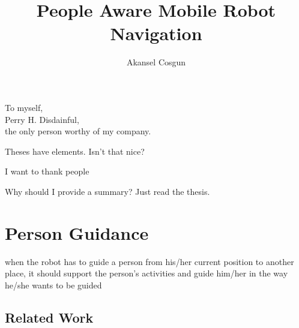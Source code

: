 \documentclass[12pt]{gatech-thesis}
\title{People Aware Mobile Robot Navigation} %
\author{Akansel Cosgun}
\begin{document}
%

\begin{preliminary}
\begin{dedication}
\null\vfil
{\large
\begin{center}
To myself,\\\vspace{12pt}
Perry H. Disdainful,\\\vspace{12pt}
the only person worthy of my company.
\end{center}}
\vfil\null
\end{dedication}
\begin{preface}
Theses have elements.  Isn't that nice?
\end{preface}
\begin{acknowledgements}
I want to thank people
\end{acknowledgements}
\contents
\begin{summary}
Why should I provide a summary?  Just read the thesis.
\end{summary}
\end{preliminary}









%

\chapter{Person Guidance}
\label{chapter:person_guidance}

when the robot has to guide a person from his/her current position to another place, it should support the person's activities and guide him/her in the way he/she wants to be guided

\section{Related Work}
\end{document}
